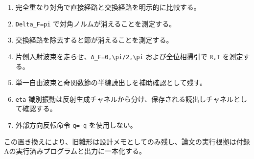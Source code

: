 \documentclass[
  a4paper,
]{article}
\providecommand{\tightlist}{%
  \setlength{\itemsep}{0pt}\setlength{\parskip}{0pt}}
\begin{document}
\begin{enumerate}
\def\labelenumi{\arabic{enumi}.}
\tightlist
\item
  完全重なり対角で直接経路と交換経路を明示的に比較する。
\item
  \texttt{Delta\_F=pi} で対角ノルムが消えることを測定する。
\item
  交換経路を除去すると節が消えることを測定する。
\item
  片側入射波束を走らせ、\texttt{Δ\_F=0,\textbackslash{}pi/2,\textbackslash{}pi}
  および全位相掃引で \texttt{R,T} を測定する。
\item
  単一自由波束と奇関数節の半線読出しを補助確認として残す。
\item
  \texttt{eta}
  識別振動は反射生成チャネルから分け、保存される読出しチャネルとして確認する。
\item
  外部方向反転命令 \texttt{q=-q} を使用しない。
\end{enumerate}

この置き換えにより、旧雛形は設計メモとしてのみ残し、論文の実行根拠は付録Aの実行済みプログラムと出力に一本化する。
\end{document}

